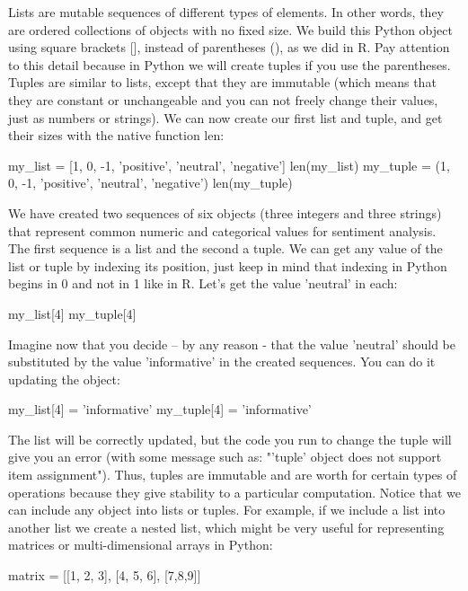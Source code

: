 Lists are mutable sequences of different types of elements. In other words, they are ordered collections of objects with no fixed size. We build this Python object using square brackets [], instead of parentheses (), as we did in R. Pay attention to this detail because in Python we will create tuples if you use the parentheses. Tuples are similar to lists, except that they are immutable (which means that they are constant or unchangeable and you can not freely change their values, just as numbers or strings).  We can now create our first list and tuple, and get their sizes with the native function len:

\begin{examplepy}
my_list = [1, 0, -1, 'positive', 'neutral', 'negative']
len(my_list)
my_tuple = (1, 0, -1, 'positive', 'neutral', 'negative')
len(my_tuple)
\end{examplepy}
	
We have created two sequences of six objects (three integers and three strings) that represent common numeric and categorical values for sentiment analysis. The first sequence is a list and the second a tuple. We can get any value of the list or tuple by indexing its position, just keep in mind that indexing in Python begins in 0 and not in 1 like in R. Let's get the value 'neutral' in each:

\begin{examplepy}
my_list[4]
my_tuple[4]
\end{examplepy}

Imagine now that you decide – by any reason - that the value 'neutral' should be substituted by the value 'informative' in the created sequences. You can do it updating the object:

\begin{examplepy}
my_list[4] = 'informative'
my_tuple[4] = 'informative'
\end{examplepy}

The list will be correctly updated, but the code you run to change the tuple will give you an error (with some message such as: "'tuple' object does not support item assignment"). Thus, tuples are immutable and are worth for certain types of operations because they give stability to a particular computation. Notice that we can include any object into lists or tuples. For example, if we include a list into another list we create a nested list, which might be very useful for representing matrices or multi-dimensional arrays in Python:

\begin{examplepy}
matrix = [[1, 2, 3], [4, 5, 6], [7,8,9]] 
\end{examplepy}	

